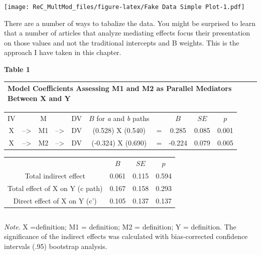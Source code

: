 \documentclass[
  english,
]{book}
\begin{document}
\texttt{[image: ReC\_MultMod\_files/figure-latex/Fake Data Simple Plot-1.pdf]}

There are a number of ways to tabalize the data. You might be surprised to learn that a number of articles that analyze mediating effects focus their presentation on those values and not the traditional intercepts and B weights. This is the approach I have taken in this chapter.

\textbf{Table 1 }

\begin{longtable}[]{@{}
  >{\raggedright\arraybackslash}p{}@{}}
\toprule
Model Coefficients Assessing M1 and M2 as Parallel Mediators Between X and Y \\
\midrule
\endhead
\bottomrule
\end{longtable}

\begin{longtable}[]{@{}cccccccccc@{}}
\toprule
& & & & & & & & & \\
\midrule
\endhead
IV & & M & & DV & \(B\) for \emph{a} and \emph{b} paths & & \(B\) & \(SE\) & \(p\) \\
X & --\textgreater{} & M1 & --\textgreater{} & DV & (0.528) X (0.540) & = & 0.285 & 0.085 & 0.001 \\
X & --\textgreater{} & M2 & --\textgreater{} & DV & (-0.324) X (0.690) & = & -0.224 & 0.079 & 0.005 \\
\bottomrule
\end{longtable}

\begin{longtable}[]{@{}cccc@{}}
\toprule
& & & \\
\midrule
\endhead
& \(B\) & \(SE\) & \(p\) \\
Total indirect effect & 0.061 & 0.115 & 0.594 \\
Total effect of X on Y (c path) & 0.167 & 0.158 & 0.293 \\
Direct effect of X on Y (c') & 0.105 & 0.137 & 0.137 \\
\bottomrule
\end{longtable}

\begin{longtable}[]{@{}l@{}}
\toprule
 \\
\midrule
\endhead
\bottomrule
\end{longtable}

\emph{Note}. X =definition; M1 = definition; M2 = definition; Y = definition. The significance of the indirect effects was calculated with bias-corrected confidence intervals (.95) bootstrap analysis.
\end{document}
